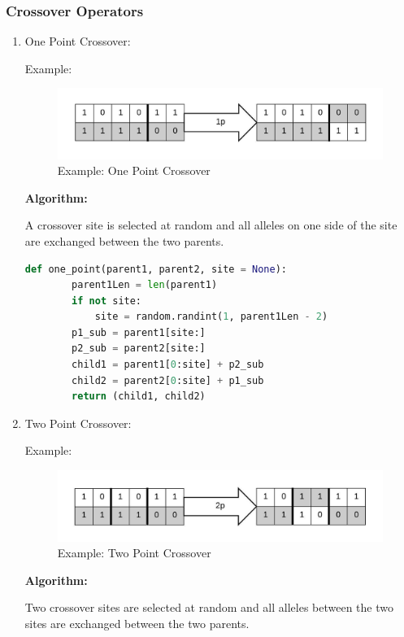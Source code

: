 \documentclass[12pt,a4paper]{article}
\begin{document}
	\subsubsection{Crossover Operators} \label{sec:crossover}
	\begin{enumerate}

	\item One Point Crossover: \par
	
	Example:
	\begin{figure}[h]
		\includegraphics[width=\textwidth]{xover-1p}
		\caption{Example: One Point Crossover}
		\centering
	\end{figure}
	
	\textbf{Algorithm:} \par
	A crossover site is selected at random and all alleles on one side of the site are exchanged between the two parents.
	\begin{lstlisting}[language=Python]
    def one_point(parent1, parent2, site = None):
        parent1Len = len(parent1)
        if not site:
            site = random.randint(1, parent1Len - 2)
        p1_sub = parent1[site:]
        p2_sub = parent2[site:]
        child1 = parent1[0:site] + p2_sub
        child2 = parent2[0:site] + p1_sub
        return (child1, child2)
	\end{lstlisting}

	\item Two Point Crossover: \par
	Example:
	\begin{figure}[h]
		\includegraphics[width=\textwidth]{xover-2p}
		\caption{Example: Two Point Crossover}
		\centering
	\end{figure}
	
	\textbf{Algorithm:} \par
	Two crossover sites are selected at random and all alleles between the two sites are exchanged between the two parents.	
	

\end{enumerate}
\end{document}

